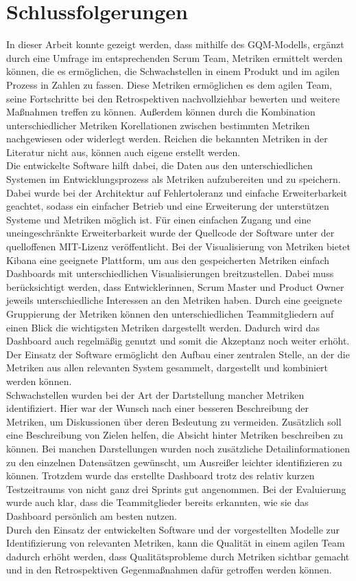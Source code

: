 \chapter{Schlussfolgerungen}

In dieser Arbeit konnte gezeigt werden, dass mithilfe des \ac{GQM}-Modells, ergänzt durch eine Umfrage im entsprechenden Scrum Team, Metriken ermittelt werden können, die es ermöglichen, die Schwachstellen in einem Produkt und im agilen Prozess in Zahlen zu fassen.
Diese Metriken ermöglichen es dem agilen Team, seine Fortschritte bei den Retrospektiven nachvollziehbar bewerten und weitere Maßnahmen treffen zu können.
Außerdem können durch die Kombination unterschiedlicher Metriken Korellationen zwischen bestimmten Metriken nachgewiesen oder widerlegt werden.
Reichen die bekannten Metriken in der Literatur nicht aus, können auch eigene erstellt werden.
\\
Die entwickelte Software hilft dabei, die Daten aus den unterschiedlichen Systemen im Entwicklungsprozess als Metriken aufzubereiten und zu speichern.
Dabei wurde bei der Architektur auf Fehlertoleranz und einfache Erweiterbarkeit geachtet, sodass ein einfacher Betrieb und eine Erweiterung der unterstützen Systeme und Metriken möglich ist.
Für einen einfachen Zugang und eine uneingeschränkte Erweiterbarkeit wurde der Quellcode der Software unter der quelloffenen MIT-Lizenz veröffentlicht.
Bei der Visualisierung von Metriken bietet Kibana eine geeignete Plattform, um aus den gespeicherten Metriken einfach Dashboards mit unterschiedlichen Visualisierungen breitzustellen.
Dabei muss berücksichtigt werden, dass Entwicklerinnen, Scrum Master und Product Owner jeweils unterschiedliche Interessen an den Metriken haben.
Durch eine geeignete Gruppierung der Metriken können den unterschiedlichen Teammitgliedern auf einen Blick die wichtigsten Metriken dargestellt werden.
Dadurch wird das Dashboard auch regelmäßig genutzt und somit die Akzeptanz noch weiter erhöht.
Der Einsatz der Software ermöglicht den Aufbau einer zentralen Stelle, an der die Metriken aus allen relevanten System gesammelt, dargestellt und kombiniert werden können.
\\
Schwachstellen wurden bei der Art der Dartstellung mancher Metriken identifiziert.
Hier war der Wunsch nach einer besseren Beschreibung der Metriken, um Diskussionen über deren Bedeutung zu vermeiden.
Zusätzlich soll eine Beschreibung von Zielen helfen, die Absicht hinter Metriken beschreiben zu können.
Bei manchen Darstellungen wurden noch zusätzliche Detailinformationen zu den einzelnen Datensätzen gewünscht, um Ausreißer leichter identifizieren zu können.
Trotzdem wurde das erstellte Dashboard trotz des relativ kurzen Testzeitraums von nicht ganz drei Sprints gut angenommen.
Bei der Evaluierung wurde auch klar, dass die Teammitglieder bereits erkannten, wie sie das Dashboard persönlich am besten nutzen.
\\
Durch den Einsatz der entwickelten Software und der vorgestellten Modelle zur Identifizierung von relevanten Metriken, kann die Qualität in einem agilen Team dadurch erhöht werden, dass Qualitätsprobleme durch Metriken sichtbar gemacht und in den Retrospektiven Gegenmaßnahmen dafür getroffen werden können.
